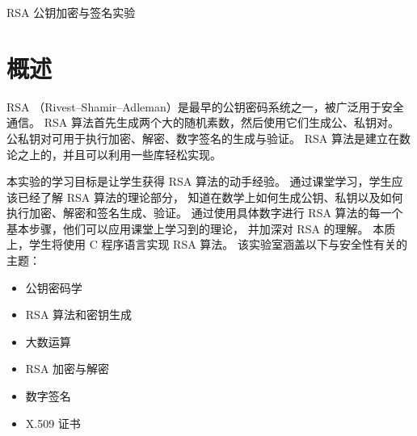 
\newcommand{\commonfolder}{../../common-files}








\begin{center}
{\LARGE RSA 公钥加密与签名实验}
\end{center}



\section{概述}

RSA （Rivest–Shamir–Adleman）是最早的公钥密码系统之一，被广泛用于安全通信。
RSA 算法首先生成两个大的随机素数，然后使用它们生成公、私钥对。
公私钥对可用于执行加密、解密、数字签名的生成与验证。
RSA 算法是建立在数论之上的，并且可以利用一些库轻松实现。

本实验的学习目标是让学生获得 RSA 算法的动手经验。
通过课堂学习，学生应该已经了解 RSA 算法的理论部分，
知道在数学上如何生成公钥、私钥以及如何执行加密、解密和签名生成、验证。
通过使用具体数字进行 RSA 算法的每一个基本步骤，他们可以应用课堂上学习到的理论，
并加深对 RSA 的理解。
本质上，学生将使用 C 程序语言实现 RSA 算法。
该实验室涵盖以下与安全性有关的主题：

\begin{itemize}[noitemsep]
\item 公钥密码学
\item RSA 算法和密钥生成
\item 大数运算
\item RSA 加密与解密
\item 数字签名
\item X.509 证书
\end{itemize}

